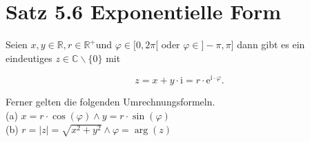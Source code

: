 \documentclass[10pt]{article}
\begin{document}
\section*{Satz 5.6 Exponentielle Form}
Seien $x, y \in \mathbb{R}, r \in \mathbb{R}^{+}$und $\varphi \in[0,2 \pi[$ oder $\varphi \in]-\pi, \pi]$ dann gibt es ein eindeutiges $z \in \mathbb{C} \backslash\{0\}$ mit


\begin{equation*}
z=x+y \cdot \mathrm{i}=r \cdot \mathrm{e}^{\mathrm{i} \cdot \varphi} . \tag{5.30}
\end{equation*}


Ferner gelten die folgenden Umrechnungsformeln.\\
(a) $x=r \cdot \cos (\varphi) \wedge y=r \cdot \sin (\varphi)$\\
(b) $r=|z|=\sqrt{x^{2}+y^{2}} \wedge \varphi=\arg (z)$
\end{document}
